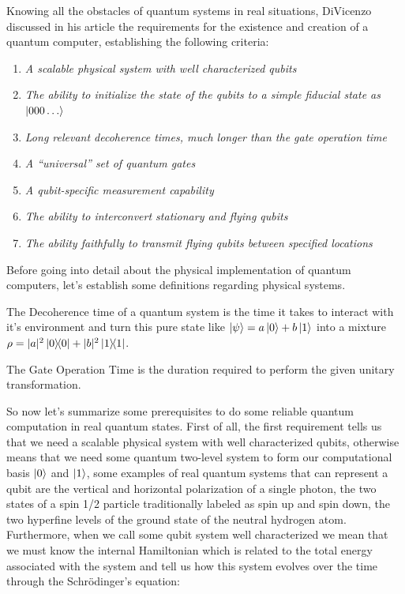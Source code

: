 \documentclass[
  journal=largetwo,
  year=2023,
]{cup-journal}
\begin{document}
Knowing all the obstacles of quantum systems in real situations, DiVicenzo discussed in his article \autocite{divincenzo_2000_the} the requirements for the existence and creation of a quantum computer, establishing the following criteria:
\begin{enumerate}
  \item \emph{A scalable physical system with well characterized qubits}
  \item \emph{The ability to initialize the state of the qubits to a simple fiducial state as \(\ket{000\dots}\)}
  \item \emph{Long relevant decoherence times, much longer than the gate operation time}
  \item \emph{A “universal” set of quantum gates}
  \item \emph{A qubit-specific measurement capability}
  \item \emph{The ability to interconvert stationary and flying qubits}
  \item \emph{The ability faithfully to transmit flying qubits between specified locations}
\end{enumerate}

Before going into detail about the physical implementation of quantum computers, let's establish some definitions regarding physical systems.


The Decoherence time of a quantum system is the time it takes to interact with it's environment and turn this pure state like \(\ket{\psi} = a\ket{0} + b\ket{1}\) into a mixture \( \rho = |a|^2\ketbra{0}{0} + |b|^2\ketbra{1}{1} \).

The Gate Operation Time is the duration required to perform the given unitary transformation.


So now let's summarize some prerequisites to do some reliable quantum computation in real quantum states. First of all, the first requirement tells us that we need a scalable physical system with well characterized qubits, otherwise means that we need some quantum two-level system to form our computational basis \(\ket{0}\) and \(\ket{1}\), some examples of real quantum systems that can represent a qubit are the vertical and horizontal polarization of a single photon, the two states of a spin 1/2 particle traditionally labeled as spin up and spin down, the two hyperfine levels of the ground state of the neutral hydrogen atom. Furthermore, when we call some qubit system well characterized we mean that we must know the internal Hamiltonian which is related to the total energy associated with the system and tell us how this system evolves over the time through the Schrödinger's equation:
\end{document}
